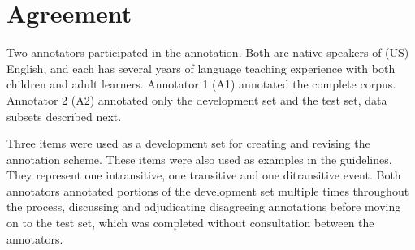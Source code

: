 \section{Agreement}
\label{sec:agreement}
Two annotators participated in the annotation. Both are native speakers of (US) English, and each has several years of language teaching experience with both children and adult learners. Annotator 1 (A1) annotated the complete corpus. Annotator 2 (A2) annotated only the development set and the test set, data subsets described next.

Three items were used as a development set for creating and revising the annotation scheme. These items were also used as examples in the guidelines. They represent one intransitive, one transitive and one ditransitive event. Both annotators annotated portions of the development set multiple times throughout the process, discussing and adjudicating disagreeing annotations before moving on to the test set, which was completed without consultation between the annotators.

